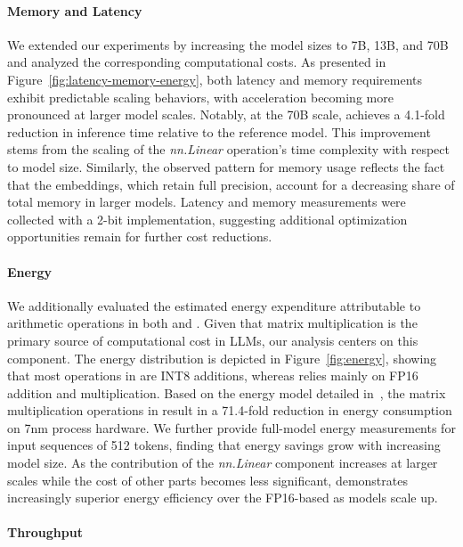 \paragraph{Memory and Latency}

We extended our experiments by increasing the model sizes to 7B, 13B, and 70B and analyzed the corresponding computational costs. As presented in Figure~\ref{fig:latency-memory-energy}, both latency and memory requirements exhibit predictable scaling behaviors, with acceleration becoming more pronounced at larger model scales. Notably, at the 70B scale,  achieves a 4.1-fold reduction in inference time relative to the  reference model. This improvement stems from the scaling of the \emph{nn.Linear} operation’s time complexity with respect to model size. Similarly, the observed pattern for memory usage reflects the fact that the embeddings, which retain full precision, account for a decreasing share of total memory in larger models. Latency and memory measurements were collected with a 2-bit implementation, suggesting additional optimization opportunities remain for further cost reductions.

\paragraph{Energy}

We additionally evaluated the estimated energy expenditure attributable to arithmetic operations in both  and . Given that matrix multiplication is the primary source of computational cost in LLMs, our analysis centers on this component. The energy distribution is depicted in Figure~\ref{fig:energy}, showing that most operations in  are INT8 additions, whereas  relies mainly on FP16 addition and multiplication. Based on the energy model detailed in~\cite{energycost, pokebnn}, the matrix multiplication operations in  result in a 71.4-fold reduction in energy consumption on 7nm process hardware. We further provide full-model energy measurements for input sequences of 512 tokens, finding that energy savings grow with increasing model size. As the contribution of the \emph{nn.Linear} component increases at larger scales while the cost of other parts becomes less significant,  demonstrates increasingly superior energy efficiency over the FP16-based  as models scale up.

\paragraph{Throughput}

